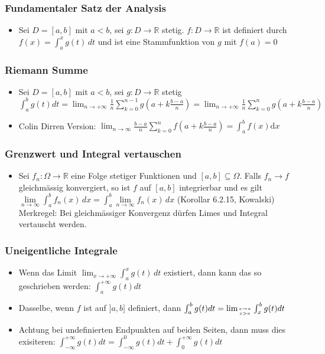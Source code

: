 \documentclass[a3paper, 11pt, landscape]{scrartcl}
\begin{document}
\begin{multicols*}{3}
	\subsubsection{Fundamentaler Satz der Analysis}
	\begin{itemize}
	    \item Sei $D=[a,b]$ mit $a<b$, sei $g:D\to\mathbb{R}$ stetig. $f:D\to\mathbb{R}$ ist definiert durch $f(x)=\int_a^x g(t)\,dt$ und ist eine Stammfunktion von $g$ mit $f(a)=0$
	\end{itemize}
	\subsubsection{Riemann Summe}
	\begin{itemize}
	    \item Sei $D=[a,b]$ mit $a<b$, sei $g:D\to\mathbb{R}$ stetig\\
	    $\int_{a}^{b} g(t) d t=\lim _{n \rightarrow+\infty} \frac{1}{n} \sum_{k=0}^{n-1} g\left(a+k \frac{b-a}{n}\right)=\lim _{n \rightarrow+\infty} \frac{1}{n} \sum_{k=0}^{n} g\left(a+k \frac{b-a}{n}\right)$
	    \item Colin Dirren Version: $\lim _{n \rightarrow \infty} \frac{b-a}{n} \sum_{k=0}^{n} f\left(a+k \frac{b-a}{n}\right)=\int_{a}^{b} f(x) \mathrm{d} x$
	\end{itemize}
	\subsubsection{Grenzwert und Integral vertauschen}
	\begin{itemize}
	    \item Sei $f_n:\Omega\to\mathbb{R}$ eine Folge stetiger Funktionen und $[a,b]\subseteq\Omega$. Falls $f_n\to f$ gleichmässig konvergiert, so ist $f$ auf $[a,b]$ integrierbar und es gilt $\lim\limits_{n\to\infty}\int_a^b f_n(x)\,dx = \int_a^b \lim\limits_{n\to\infty}f_n(x)\,dx$ (Korollar 6.2.15, Kowalski)\\
	    Merkregel: Bei gleichmässiger Konvergenz dürfen Limes und Integral vertauscht werden.
	\end{itemize}
	\subsubsection{Uneigentliche Integrale}
	\begin{itemize}
	    \item Wenn das Limit $\lim _{x \rightarrow+\infty} \int_{a}^{x} g(t) \,d t$ existiert, dann kann das so geschrieben werden: $\int_{a}^{+\infty} g(t) d t$
	    \item Dasselbe, wenn $f$ ist auf $]a,b]$ definiert, dann $\int_{a}^{b} g(t) d t=\lim _{x \rightarrow a \atop x>a} \int_{x}^{b} g(t) d t$
	    \item Achtung bei undefinierten Endpunkten auf beiden Seiten, dann muss dies exisiteren: $\int_{-\infty}^{+\infty} g(t) d t=\int_{-\infty}^{0} g(t) d t+\int_{0}^{+\infty} g(t) d t$
	    

\end{itemize}
\end{multicols*}
\end{document}

